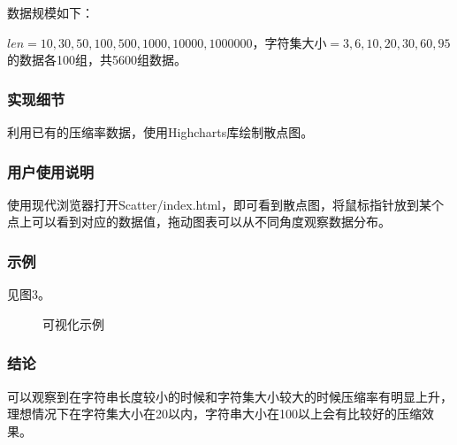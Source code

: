 \documentclass{article}
\begin{document}
数据规模如下：

$len=10,30,50,100,500,1000,10000,1000000$，字符集大小$=3,6,10,20,30,60,95$的数据各100组，共5600组数据。

\subsubsection{实现细节}

利用已有的压缩率数据，使用Highcharts库绘制散点图。

\subsubsection{用户使用说明}

使用现代浏览器打开Scatter/index.html，即可看到散点图，将鼠标指针放到某个点上可以看到对应的数据值，拖动图表可以从不同角度观察数据分布。

\subsubsection{示例}

见图3。

\begin{figure}[htbp]
    
    
    \caption{可视化示例}
    
\end{figure}

\subsubsection{结论}

可以观察到在字符串长度较小的时候和字符集大小较大的时候压缩率有明显上升，理想情况下在字符集大小在20以内，字符串大小在100以上会有比较好的压缩效果。
\end{document}
